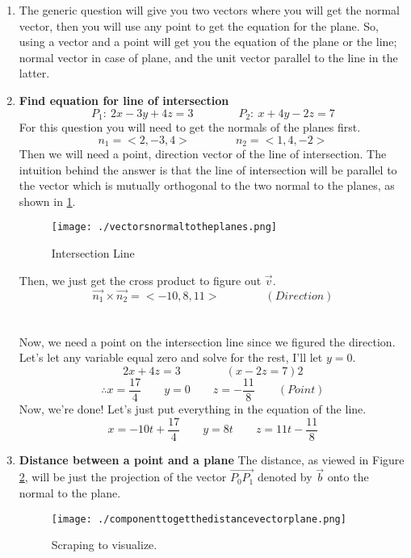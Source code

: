 \documentclass{article}
\begin{document}
\begin{enumerate}[1.]
	\item The generic question will give you two vectors where you will get the normal vector, then you will use any point to get the equation for the plane. So, using a vector and a point will get you the equation of the plane or the line; normal vector in case of plane, and the unit vector parallel to the line in the latter.

	\item \textbf{Find equation for line of intersection} \[
			P_1:\ 2x-3y+4z=3 \qquad \qquad P_2:\ x+4y-2z=7
		\]
		For this question you will need to get the normals of the planes first.
		\[
			n_1=<2,-3,4> \qquad \qquad n_2=<1,4,-2>
		\]
		Then we will need a point, direction vector of the line of intersection. The intuition behind the answer is that the line of intersection will be parallel to the vector which is mutually orthogonal to the two normal to the planes, as shown in \ref{fig:-vectorsnormaltotheplanes-png}.

		\begin{figure}[h!] 
			\centering
			\texttt{[image: ./vectorsnormaltotheplanes.png]}
			\caption{Intersection Line}
			\label{fig:-vectorsnormaltotheplanes-png}
		\end{figure}

		Then, we just get the cross product to figure out $\vec{v}$. 
		\[
			\vec{ n_1 } \times \vec{ n_2 } = <-10,8,11> \qquad \qquad (Direction)
		\]\\\\
		Now, we need a point on the intersection line since we figured the direction. 
		Let's let any variable equal zero and solve for the rest, I'll let $y=0$. 
		\[
			2x+4z=3 \qquad \qquad
			(x-2z=7)2 	
		\]
		\[
			\therefore x = \frac{17}{4} \qquad y = 0 \qquad z = -\frac{11}{8} \qquad (Point)
		\]
		Now, we're done! Let's just put everything in the equation of the line.
		\[
			x = -10t+\frac{17}{4} \qquad y=8t \qquad z= 11t-\frac{11}{8}
		\]
	\item \textbf{Distance between a point and a plane}
		The distance, as viewed in Figure \ref{fig:scapingdistance_1}, will be just the projection of the vector $ \vec{ P_0P_1 } $ denoted by $ \vec{ b } $ onto the normal to the plane. 
		\begin{figure}[h!]
			\centering
			\texttt{[image: ./componenttogetthedistancevectorplane.png]}
			\caption{Scraping to visualize.}
			\label{fig:scapingdistance_1}
		\end{figure}	


\end{enumerate}
\end{document}
